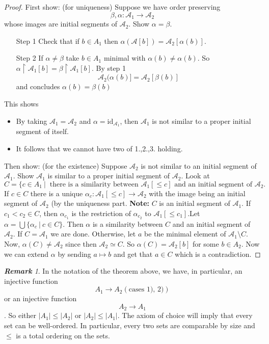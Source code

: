 \documentclass[a4paper,oneside,11pt,DIV=12,parskip=half]{scrartcl}
\newcommand{\A}{\mathcal A}
\theoremstyle{plain}
\theoremstyle{definition}
\newtheorem{remark, definition}[theorem]{Remark and Definition.}
\newtheorem{lemma, definition}[theorem]{Lemma and Definition.}
\newtheorem{theorem, definition}[theorem]{Theorem and Definition.}
\theoremstyle{remark}
\newtheorem*{remark}{\textbf{Remark}}
\newtheorem*{remark, example}{\textbf{Remark and Exercise}}
\begin{document}
\begin{proof}
First show: (for uniqueness)
Suppose we have order preserving
    \[ \beta,\alpha: \A_1 \rightarrow \A_2 \]
whose images are initial segments of $\A_2$. Show $\alpha = \beta$.
\begin{enumerate} 
    \item[Step 1] Check that if $b \in A_1$ then $\alpha(\A[b]) = \A_2[\alpha(b)]$.
    \item[Step 2] If $\alpha \neq \beta$ take $b \in A_1$ minimal with $\alpha(b) \neq \alpha(b)$. So $\alpha \upharpoonright \A_1[b] = \beta \upharpoonright \A_1[b] $. By step 1
        \[ \A_2(\alpha(b)] = \A_2[\beta(b)] \]
    and concludes $\alpha(b) = \beta(b)$
\end{enumerate}
This shows
\begin{itemize}
    \item By taking $\A_1 = \A_2$ and $\alpha = \mathrm{id}_{\A_1}$, then $\A_1$ is not similar to a proper initial segment of itself.
    \item It follows that we cannot have two of 1.,2.,3. holding.
\end{itemize}
Then show: (for the existence)
Suppose $\A_2$ is not similar to an initial segment of $\A_1$. Show $\A_1$ is similar to a proper initial segment of $\A_2$. Look at
    \[ C= \{ c \in A_1 ~|~ \text{ there is a similarity between $\A_1[\leq c]$ and an initial segment of $\A_2$}. \]
If $c \in C$ there is a unique $\alpha_c : \A_1[\leq c] \rightarrow \A_2$ with the image being an initial segment of $\A_2$ (by the uniqueness part.
\textbf{Note:} $C$ is an initial segment of $\A_1$. If $c_1 < c_2 \in C$, then $\alpha_{c_1}$ is the restriction of $\alpha_{c_2}$ to $\A_1[\leq c_1]$.Let $\alpha = \bigcup \{\alpha_c ~|~ c \in C \}$.
Then $\alpha$ is a similarity between $C$ and an initial segment of $\A_2$.
If $C = \A_1$ we are done.
Otherwise, let $a$ be the minimal element of $\A_1 \setminus C$.
Now, $\alpha(C) \neq \A_2$ since then $\A_2 \simeq C$.
So $\alpha(C) = \A_2[b]$ for some $b \in A_2$. Now we can extend $\alpha$ by sending $a \mapsto b$ and get that $a \in C$ which is a contradiction.

\end{proof}

\begin{remark}
In the notation of the theorem above, we have, in particular, an injective function
\[ A_1 \rightarrow A_2 (\text{cases 1), 2)}) \]
or an injective function 
\[A_2 \rightarrow A_1\].
So either $|A_1| \leq |A_2|$ or $|A_2| \leq |A_1|$.
The axiom of choice will imply that every set can be well-ordered. In particular, every two sets are comparable by size and $\leq$ is a total ordering on the sets.
\end{remark}
\end{document}
